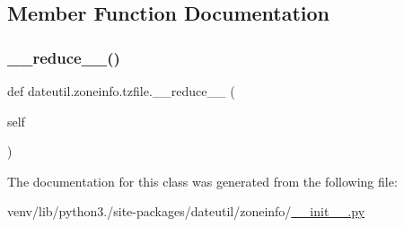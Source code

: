 \subsection{Member Function Documentation}
\mbox{\label{classdateutil_1_1zoneinfo_1_1tzfile_a916497cc0df42d9d4f1f3b06b490690f}} 
\subsubsection{\texorpdfstring{\+\_\+\+\_\+reduce\+\_\+\+\_\+()}{\_\_reduce\_\_()}}
{\footnotesize\ttfamily def dateutil.\+zoneinfo.\+tzfile.\+\_\+\+\_\+reduce\+\_\+\+\_\+ (\begin{DoxyParamCaption}\item[{}]{self }\end{DoxyParamCaption})}



The documentation for this class was generated from the following file\+:\begin{DoxyCompactItemize}
\item 
venv/lib/python3./site-\/packages/dateutil/zoneinfo/\hyperlink{venv_2lib_2python3_89_2site-packages_2dateutil_2zoneinfo_2____init_____8py}{\+\_\+\+\_\+init\+\_\+\+\_\+.\+py}\end{DoxyCompactItemize}
